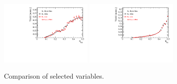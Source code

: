 \begin{figure}[h]
\includegraphics[height=!,width=0.4\textwidth]{figs/dataVsMC/finalState_norm/Ds2all_Bs_TAGOMEGA_OS.pdf}
\includegraphics[height=!,width=0.4\textwidth]{figs/dataVsMC/finalState_norm/Ds2all_Bs_SS_nnetKaon_PROB.pdf}


\caption{Comparison of selected variables.}
\label{fig:}
\end{figure}

